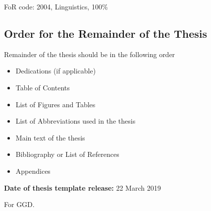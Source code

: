 
FoR code: 2004, Linguistics, 100\% \\



\begin{instructional}
\section*{Order for the Remainder of the Thesis}
\noindent
    Remainder of the thesis should be in the following order

    \begin{itemize}
        \item Dedications (if applicable)
        \item Table of Contents
        \item List of Figures and Tables
        \item List of Abbreviations used in the thesis
        \item Main text of the thesis
        \item Bibliography or List of References
        \item Appendices
    \end{itemize}

\noindent
\textbf{Date of thesis template release:} 22 March 2019
\end{instructional}
\clearpage


	\rmfamily
	\normalfont

	\begin{vplace}[1]
		\begin{center}
			For GGD.
		\end{center}
	\end{vplace}


\clearpage
\pagestyle{headings}


\tableofcontents
	\clearpage
\listoffigures
	\clearpage
\listoftables
\newpage

